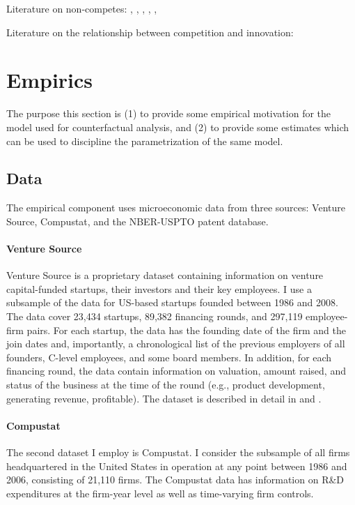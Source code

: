 \documentclass[12pt,english]{article}
\theoremstyle{remark}
\begin{document}
Literature on non-competes: \cite{saxenian_regional_1994}, \cite{gilson_legal_1999}, \cite{jeffers_impact_2018}, \cite{marx_mobility_2009}, \cite{marx_regional_2015}, \cite{starr_noncompetes_2019}

Literature on the relationship between competition and innovation: \cite{aghion_competition_2005}


\section{Empirics}\label{Empirics}

The purpose this section is (1) to provide some empirical motivation for the model used for counterfactual analysis, and (2) to provide some estimates which can be used to discipline the parametrization of the same model. 

\subsection{Data}

The empirical component uses microeconomic data from three sources: Venture Source, Compustat, and the NBER-USPTO patent database.

\paragraph{Venture Source}

Venture Source is a proprietary dataset containing information on venture capital-funded startups, their investors and their key employees. I use a subsample of the data for US-based startups founded between 1986 and 2008. The data cover 23,434 startups, 89,382 financing rounds, and 297,119 employee-firm pairs. For each startup, the data has the founding date of the firm and the join dates and, importantly, a chronological list of the previous employers of all founders, C-level employees, and some board members. In addition, for each financing round, the data contain information on valuation, amount raised, and status of the business at the time of the round (e.g., product development, generating revenue, profitable). The dataset is described in detail in \cite{kaplan_how_2002} and \cite{kaplan_venture_2016}. 

\paragraph{Compustat}

The second dataset I employ is Compustat. I consider the subsample of all firms headquartered in the United States in operation at any point between 1986 and 2006, consisting of 21,110 firms. The Compustat data has information on R\&D expenditures at the firm-year level as well as time-varying firm controls.
\end{document}
